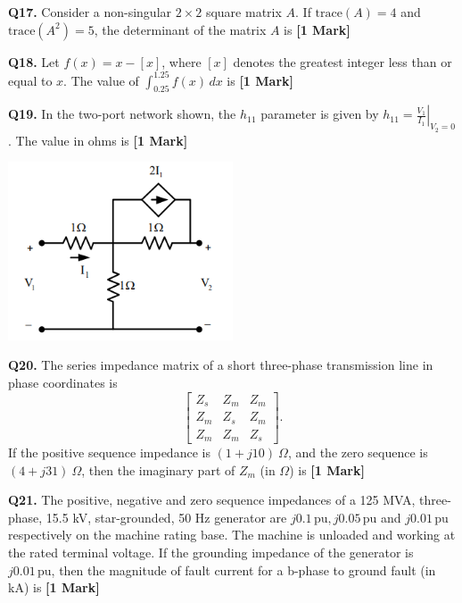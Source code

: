 \documentclass[11pt]{article}
\newcommand{\questiona}[2]{
    \noindent\textbf{Q#2.} #1 \hfill \textbf{[1 Mark]}
}
\begin{document}
\questiona{Consider a non-singular \( 2 \times 2 \) square matrix \( A \). If \( \text{trace}(A) = 4 \) and \( \text{trace}(A^2) = 5 \), the determinant of the matrix \( A \) is}{17}
\vspace{0.5cm}

\questiona{Let \( f(x) = x - [x] \), where \( [x] \) denotes the greatest integer less than or equal to \( x \). The value of \( \int_{0.25}^{1.25} f(x) \, dx \) is}{18}
\vspace{0.5cm}

\questiona{In the two-port network shown, the \( h_{11} \) parameter is given by \( h_{11} = \left. \frac{V_1}{I_1} \right|_{V_2=0} \). The value in ohms is}{19}
\begin{center}
\includegraphics[width=0.5\textwidth]{figures/19.png}
\end{center}
\vspace{0.5cm}

\questiona{The series impedance matrix of a short three-phase transmission line in phase coordinates is
\[
\begin{bmatrix}
Z_s & Z_m & Z_m \\
Z_m & Z_s & Z_m \\
Z_m & Z_m & Z_s
\end{bmatrix}.
\]
If the positive sequence impedance is \( (1 + j10)~\Omega \), and the zero sequence is \( (4 + j31)~\Omega \), then the imaginary part of \( Z_m \) (in \( \Omega \)) is}{20}
\vspace{0.5cm}

\questiona{The positive, negative and zero sequence impedances of a 125 MVA, three-phase, 15.5 kV, star-grounded, 50 Hz generator are \( j0.1 \, \text{pu}, j0.05 \, \text{pu} \) and \( j0.01 \, \text{pu} \) respectively on the machine rating base. The machine is unloaded and working at the rated terminal voltage. If the grounding impedance of the generator is \( j0.01 \, \text{pu} \), then the magnitude of fault current for a b-phase to ground fault (in kA) is}{21}
\vspace{0.5cm}
\end{document}
